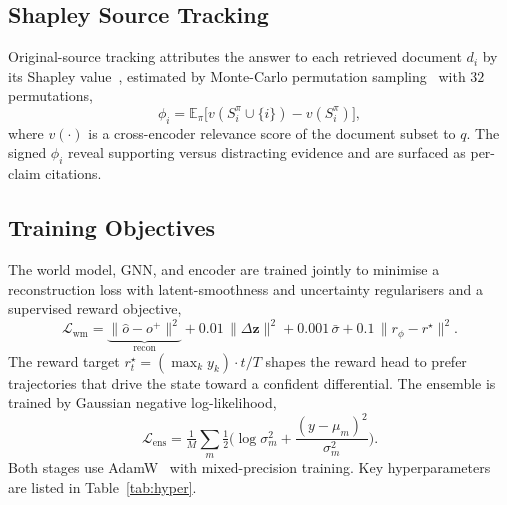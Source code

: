 \documentclass[11pt,a4paper]{report}
\begin{document}
\subsection{Shapley Source Tracking}
Original-source tracking attributes the answer to each retrieved document $d_i$
by its Shapley value~\cite{shapley1953value}, estimated by Monte-Carlo
permutation sampling~\cite{lundberg2017shap} with $32$ permutations,
\begin{equation}
\phi_i=\mathbb{E}_{\pi}\big[v(S_i^\pi\cup\{i\})-v(S_i^\pi)\big],
\end{equation}
where $v(\cdot)$ is a cross-encoder relevance score of the document subset to
$q$. The signed $\phi_i$ reveal supporting versus distracting evidence and are
surfaced as per-claim citations.

\subsection{Training Objectives}
The world model, GNN, and encoder are trained jointly to minimise a
reconstruction loss with latent-smoothness and uncertainty regularisers and a
supervised reward objective,
\begin{equation}
\mathcal{L}_{\text{wm}} = \underbrace{\|\hat{o}-o^+\|^2}_{\text{recon}}
+ 0.01\,\|\Delta\mathbf{z}\|^2
+ 0.001\,\bar{\sigma}
+ 0.1\,\|r_\phi-r^\star\|^2 .
\end{equation}
The reward target $r^\star_t = (\max_k y_k)\cdot t/T$ shapes the reward head to
prefer trajectories that drive the state toward a confident differential. The
ensemble is trained by Gaussian negative log-likelihood,
\begin{equation}
\mathcal{L}_{\text{ens}}=\tfrac{1}{M}\sum_m\tfrac{1}{2}
\Big(\log\sigma_m^2+\frac{(y-\mu_m)^2}{\sigma_m^2}\Big).
\end{equation}
Both stages use AdamW~\cite{kingma2015adam} with mixed-precision training.
Key hyperparameters are listed in Table~\ref{tab:hyper}.
\end{document}
